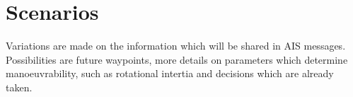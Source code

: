 \chapter{Scenarios}
Variations are made on the information which will be shared in AIS messages. 
Possibilities are future waypoints, more details on parameters which determine manoeuvrability, such as rotational intertia and decisions which are already taken.